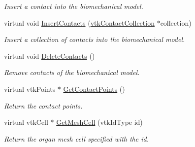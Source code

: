 \begin{DoxyCompactItemize}
\begin{DoxyCompactList}\small\item\em Insert a contact into the biomechanical model. \item\end{DoxyCompactList}\item 
virtual void \hyperlink{classvtkBioMechanicalModel_a6856ee291a45b9a0332e9319c383d189}{InsertContacts} (\hyperlink{classvtkContactCollection}{vtkContactCollection} $\ast$collection)
\begin{DoxyCompactList}\small\item\em Insert a collection of contacts into the biomechanical model. \item\end{DoxyCompactList}\item 
\hypertarget{classvtkBioMechanicalModel_a7f37494761cad528563094c3570eec7f}{
virtual void \hyperlink{classvtkBioMechanicalModel_a7f37494761cad528563094c3570eec7f}{DeleteContacts} ()}
\label{classvtkBioMechanicalModel_a7f37494761cad528563094c3570eec7f}

\begin{DoxyCompactList}\small\item\em Remove contacts of the biomechanical model. \item\end{DoxyCompactList}\item 
\hypertarget{classvtkBioMechanicalModel_a9509f53b091978d1149a9e538995288f}{
virtual vtkPoints $\ast$ \hyperlink{classvtkBioMechanicalModel_a9509f53b091978d1149a9e538995288f}{GetContactPoints} ()}
\label{classvtkBioMechanicalModel_a9509f53b091978d1149a9e538995288f}

\begin{DoxyCompactList}\small\item\em Return the contact points. \item\end{DoxyCompactList}\item 
\hypertarget{classvtkBioMechanicalModel_a4046ce861cca17c60ad4229f92d022b5}{
virtual vtkCell $\ast$ \hyperlink{classvtkBioMechanicalModel_a4046ce861cca17c60ad4229f92d022b5}{GetMeshCell} (vtkIdType id)}
\label{classvtkBioMechanicalModel_a4046ce861cca17c60ad4229f92d022b5}

\begin{DoxyCompactList}\small\item\em Return the organ mesh cell specified with the id. \item\end{DoxyCompactList}\end{DoxyCompactItemize}
